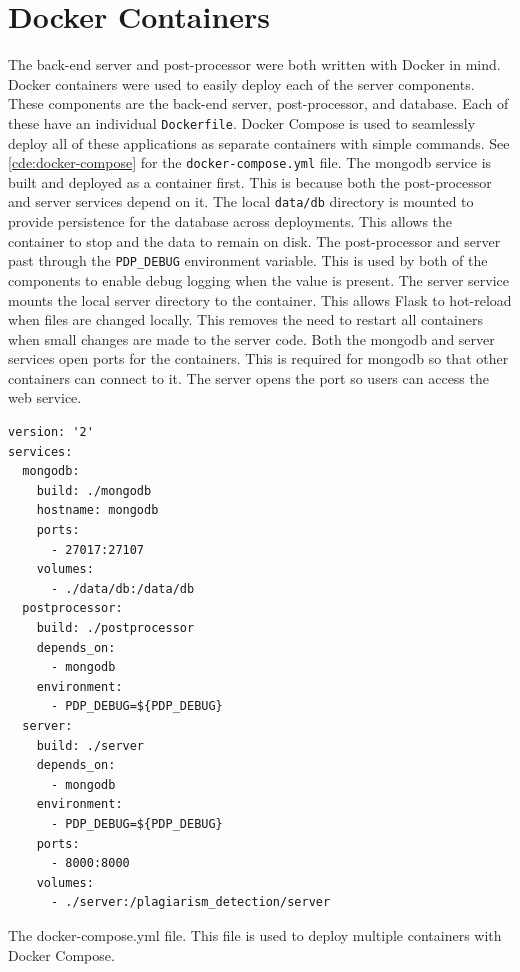 \newpage

\section{Docker Containers}
The back-end server and post-processor were both written with Docker in mind. Docker containers were used to easily deploy each of the server components. These components are the back-end server, post-processor, and database. Each of these have an individual \texttt{Dockerfile}. Docker Compose is used to seamlessly deploy all of these applications as separate containers with simple commands. See \autoref{cde:docker-compose} for the \texttt{docker-compose.yml} file. The mongodb service is built and deployed as a container first. This is because both the post-processor and server services depend on it. The local \texttt{data/db} directory is mounted to provide persistence for the database across deployments. This allows the container to stop and the data to remain on disk. The post-processor and server past through the \texttt{PDP\_DEBUG} environment variable. This is used by both of the components to enable debug logging when the value is present. The server service mounts the local server directory to the container. This allows Flask to hot-reload when files are changed locally. This removes the need to restart all containers when small changes are made to the server code. Both the mongodb and server services open ports for the containers. This is required for mongodb so that other containers can connect to it. The server opens the port so users can access the web service.

\begin{code}
\begin{verbatim}
version: '2'
services:
  mongodb:
    build: ./mongodb
    hostname: mongodb
    ports:
      - 27017:27107
    volumes:
      - ./data/db:/data/db
  postprocessor:
    build: ./postprocessor
    depends_on:
      - mongodb
    environment:
      - PDP_DEBUG=${PDP_DEBUG}
  server:
    build: ./server
    depends_on:
      - mongodb
    environment:
      - PDP_DEBUG=${PDP_DEBUG}
    ports:
      - 8000:8000
    volumes:
      - ./server:/plagiarism_detection/server
\end{verbatim}
\caption{The docker-compose.yml file. This file is used to deploy multiple containers with Docker Compose.}
\label{cde:docker-compose}
\end{code}

